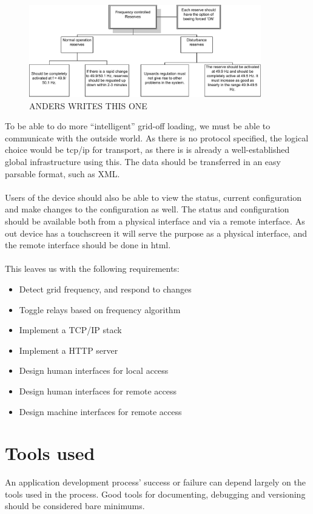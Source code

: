 \begin{figure}[!h]
  \centering
  \label{fig:reserver_demands}
  \includegraphics[width=0.9\textwidth]{figs/Demands_for_automatic_active_reserves.pdf}
  \caption{ANDERS WRITES THIS ONE}
\end{figure}
To be able to do more ``intelligent'' grid-off loading, we must be able to communicate with the outside world. As there is no protocol specified, the logical choice would be tcp/ip for transport, as there is is already a well-established global infrastructure using this. The data should be transferred in an easy parsable format, such as XML.\\\\
Users of the device should also be able to view the status, current configuration and make changes to the configuration as well. The status and configuration should be available both from a physical interface and via a remote interface. As out device has a touchscreen it will serve the purpose as a physical interface, and the remote interface should be done in html.\\\\
This leaves us with the following requirements:
\begin{itemize}
\item Detect grid frequency, and respond to changes
\item Toggle relays based on frequency algorithm
\item Implement a TCP/IP stack
\item Implement a HTTP server
\item Design human interfaces for local access
\item Design human interfaces for remote access
\item Design machine interfaces for remote access
\end{itemize}

\section{Tools used}
An application development process' success or failure can depend largely on the tools used in the process. Good tools for documenting, debugging and versioning should be considered bare minimums.
